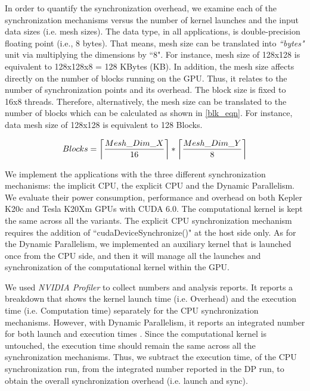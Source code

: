 \documentclass[conference]{IEEEtran}
\DeclarePairedDelimiter\ceil{\lceil}{\rceil}
\begin{document}
In order to quantify the synchronization overhead, we examine each of the synchronization mechanisms versus the number of kernel launches and the input data sizes (i.e. mesh sizes). The data type, in all applications, is double-precision floating point (i.e., 8 bytes). That means, mesh size can be translated into \emph{``bytes"} unit via multiplying the dimensions by ``8". For instance, mesh size of 128x128 is equivalent to 128x128x8 = 128 KBytes (KB). In addition, the mesh size affects directly on the number of blocks running on the GPU. Thus, it relates to the number of synchronization points and its overhead. The block size is fixed to 16x8 threads. Therefore, alternatively, the mesh size can be translated to the number of blocks which can be calculated as shown in \ref{blk_eqn}. For instance, data mesh size of 128x128 is equivalent to 128 Blocks.

\small
\begin{equation} 
\label{blk_eqn}
	Blocks = \ceil*{\frac{Mesh\_Dim\_X}{16}} * \ceil*{\frac{Mesh\_Dim\_Y}{8}} 
\end{equation}
\normalsize

We implement the applications with the three different synchronization mechanisms: the implicit CPU, the explicit CPU and the Dynamic Parallelism. We evaluate their power consumption, performance and overhead on both Kepler K20c and Tesla K20Xm GPUs with CUDA 6.0. The computational kernel is kept the same across all the variants. The explicit CPU synchronization mechanism requires the addition of  ``cudaDeviceSynchronize()" at the host side only. As for the Dynamic Parallelism, we implemented an auxiliary kernel that is launched once from the CPU side, and then it will manage all the launches and synchronization of the computational kernel within the GPU.  

We used \emph{NVIDIA Profiler} to collect numbers and analysis reports. It reports a breakdown that shows the kernel launch time (i.e. Overhead) and the execution time (i.e. Computation time) separately for the CPU synchronization mechanisms. However, with Dynamic Parallelism, it reports an integrated number for both launch and execution times . Since the computational kernel is untouched, the execution time should remain the same across all the synchronization mechanisms. Thus, we subtract the execution time, of the CPU synchronization run, from the integrated number reported in the DP run, to obtain the overall synchronization overhead (i.e. launch and sync).
\end{document}
